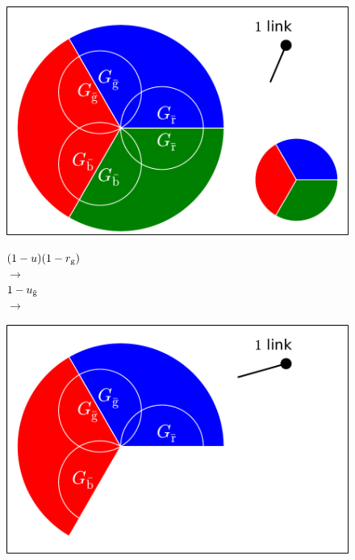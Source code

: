 \documentclass[aps, pre, onecolumn, a4paper, floatfix]{revtex4}
\begin{document}
\begin{figure}[htb]
  \begin{minipage}[b]{0.3\linewidth}
    \begin{center}
    \includegraphics[width=0.99\columnwidth]{sets_1_all.pdf}\\
      \vspace{20mm}
   \end{center}
  \end{minipage}
  \begin{minipage}[b]{0.2\linewidth}
    \begin{center}
      $(1-u)(1-r_{\rm g})$\\
      {\huge $\longrightarrow$\\}
      \vspace{20mm}
      $1-u_{\bar{\rm g}}$\\
      {\huge $\longrightarrow$\\}
      \vspace{18mm}
    \end{center}
  \end{minipage}
  \begin{minipage}[b]{0.3\linewidth}
    \begin{center}
    \includegraphics[width=0.99\columnwidth]{sets_1_no_2_gc.pdf}\\

\end{center}
\end{minipage}
\end{figure}
\end{document}
